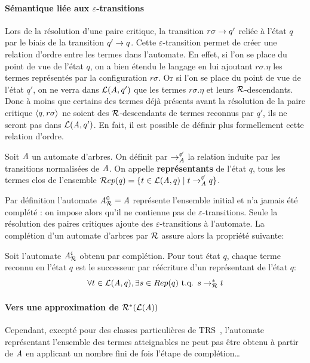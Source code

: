 \paragraph{Sémantique liée aux $\varepsilon$-transitions}
Lors de la résolution d'une paire critique, la transition $r\sigma \rightarrow q'$ reliée à l'état $q$ par le biais de la transition
$q' \rightarrow q$. Cette $\varepsilon$-transition permet de créer une relation d'ordre entre les termes dans l'automate.
En effet, si l'on se place du point de vue de l'état $q$, on a bien étendu le langage en lui ajoutant $r\sigma.\eta$
les termes représentés par la configuration $r\sigma$. Or si l'on se place du point de vue de l'état $q'$, on ne verra dans $\mathcal{L}(\mathit A,q')$
que les termes $r\sigma.\eta$ et leurs $\mathcal R$-descendants. Donc à moins que certains des termes déjà présents avant la résolution
de la paire critique $\langle q, r\sigma\rangle$ ne soient des $\mathcal R$-descendants de termes reconnus par $q'$, ils ne seront pas dans $\mathcal{L}(\mathit A, q')$.
En fait, il est possible de définir plus formellement cette relation d'ordre.
\begin{definition}
  \label{def:representants}
  Soit $\mathit A$ un automate d'arbres. On définit par $\rightarrow^{\not\varepsilon}_\mathit A$ la relation induite par les transitions normalisées de $\mathit A$.
  On appelle \textbf{représentants} de l'état $q$, tous les termes clos de l'ensemble $\mathcal R ep(q) = \{t \in \mathcal{L}(\mathit A, q)\; | \; t \rightarrow^{\not\varepsilon}_\mathit A q\}$.
\end{definition}

Par définition l'automate ${\mathit A}_{\mathcal R}^0 = \mathit A$ représente l'ensemble initial et n'a jamais été complété : on impose alors qu'il ne contienne pas 
de $\varepsilon$-transitions. Seule la résolution des paires critiques ajoute des $\varepsilon$-transitions à l'automate.
La complétion d'un automate d'arbres par $\mathcal R$ assure alors la propriété suivante:


\begin{property}
  Soit l'automate ${\mathit A}_{\mathcal R}^i$ obtenu par complétion. Pour tout état $q$, 
  chaque terme reconnu en l'état $q$ est le successeur par réécriture d'un représentant 
  de l'état $q$:
  \[\forall t \in \mathcal{L}(\mathit A, q), \exists s \in Rep(q) \mbox{ t.q. } s \rightarrow_\mathcal R^* t\]
\end{property}



\paragraph{Vers une approximation de $\mathcal R^*(\mathcal{L}(\mathit A))$}


Cependant, excepté pour des classes particulières de TRS~\cite{FeuilladeGVTT-JAR04,Genet-Habil},
l'automate représentant l'ensemble des termes atteignables ne peut pas être obtenu
à partir de $\mathit A$ en applicant un nombre fini de fois l'étape de complétion\dots


